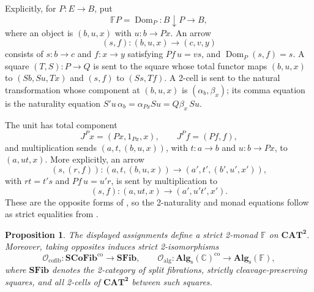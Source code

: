 \documentclass[11pt]{article}
\theoremstyle{plain}
\newtheorem{proposition}[theorem]{Proposition}
\theoremstyle{definition}
\theoremstyle{remark}
\newcommand{\CAT}{\mathbf{CAT}}
\newcommand{\SCoFib}{\mathbf{SCoFib}}
\newcommand{\SFib}{\mathbf{SFib}}
\newcommand{\Alg}{\mathbf{Alg}_{\mathrm{s}}}
\newcommand{\Dom}{\operatorname{Dom}}
\newcommand{\C}{\mathbb{C}}
\numberwithin{equation}{section}
\begin{document}
Explicitly, for
$P\colon E\to B$, put
\begin{equation*}
\mathbb F P=\Dom_{P}\colon
  B\!\downarrow\!P\longrightarrow B,
\end{equation*}
where an object is $(b,u,x)$ with $u\colon b\to Px$.  An arrow
\begin{equation*}
  (s,f)\colon(b,u,x)\longrightarrow(c,v,y)
\end{equation*}
consists of $s\colon b\to c$ and $f\colon x\to y$ satisfying
$Pf\,u=vs$, and $\Dom_{P}(s,f)=s$.  A square
$(T,S)\colon P\to Q$ is sent to the square whose total functor maps
$(b,u,x)$ to $(Sb,Su,Tx)$ and $(s,f)$ to $(Ss,Tf)$.  A 2-cell is sent
to the natural transformation whose component at $(b,u,x)$ is
$(\alpha_b,\beta_x)$; its comma equation is the naturality equation
$S'u\,\alpha_b=\alpha_{Px}Su=Q\beta_x\,Su$.

The unit has total component
\begin{equation*}
  J^{P}x=(Px,1_{Px},x),
  \qquad
  J^{P}f=(Pf,f),
\end{equation*}
and multiplication sends $(a,t,(b,u,x))$, with
$t\colon a\to b$ and $u\colon b\to Px$, to $(a,ut,x)$.
More explicitly, an arrow
\begin{equation*}
  (s,(r,f))\colon
  (a,t,(b,u,x))\longrightarrow(a',t',(b',u',x')),
\end{equation*}
with $rt=t's$ and $Pf\,u=u'r$, is sent by multiplication to
\begin{equation*}
  (s,f)\colon(a,ut,x)\longrightarrow(a',u't',x').
\end{equation*}
These are the opposite forms of
, so the 2-naturality and monad
equations follow as strict equalities from
.

\begin{proposition}\label{prop:dual-comma-monad}
The displayed assignments define a strict 2-monad
$\mathbb F$ on $\CAT^{\mathbf 2}$.  Moreover, taking opposites induces
strict 2-isomorphisms
\begin{equation}
  \mathcal O_{\mathrm{cofib}}\colon
  \SCoFib^{\mathrm{co}}\longrightarrow\SFib,
  \qquad
  \mathcal O_{\mathrm{alg}}\colon
  \Alg(\C)^{\mathrm{co}}\longrightarrow\Alg(\mathbb F),
  \label{eq:dual-2-isomorphisms}
\end{equation}
where $\SFib$ denotes the 2-category of split fibrations, strictly
cleavage-preserving squares, and all 2-cells of $\CAT^{\mathbf 2}$
between such squares.
\end{proposition}
\end{document}
